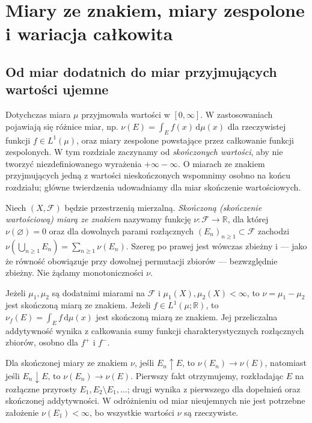 \chapter[Miary ze znakiem i zespolone]{Miary ze znakiem, miary zespolone i wariacja całkowita}
\label{ch:miary-ze-znakiem}

\section{Od miar dodatnich do miar przyjmujących wartości ujemne}
Dotychczas miara $\mu$ przyjmowała wartości w $[0,\infty]$.
W zastosowaniach pojawiają się różnice miar, np.
$\nu(E)=\int_E f(x)\,\mathrm d\mu(x)$ dla rzeczywistej
funkcji $f\in L^1(\mu)$, oraz miary zespolone
powstające przez całkowanie funkcji zespolonych.
W tym rozdziale zaczynamy od \emph{skończonych wartości},
aby nie tworzyć niezdefiniowanego wyrażenia $+\infty-\infty$.
O miarach ze znakiem przyjmujących jedną z wartości
nieskończonych wspomnimy osobno na końcu rozdziału;
główne twierdzenia udowadniamy dla miar skończenie wartościowych.

\begin{definicja}
\label{def:signed-measure-16}
Niech $(X,\mathcal F)$ będzie przestrzenią mierzalną.
\emph{Skończoną (skończenie wartościową) miarą ze znakiem}
nazywamy funkcję $\nu:\mathcal F\to\mathbb R$, dla której
$\nu(\varnothing)=0$ oraz dla dowolnych parami rozłącznych
$(E_n)_{n\ge1}\subset\mathcal F$ zachodzi
$\nu(\bigcup_{n\ge1}E_n)=\sum_{n\ge1}\nu(E_n)$.
Szereg po prawej jest wówczas zbieżny i — jako że równość
obowiązuje przy dowolnej permutacji zbiorów — bezwzględnie
zbieżny. Nie żądamy monotoniczności $\nu$.
\end{definicja}

\begin{przyklad}
Jeżeli $\mu_1,\mu_2$ są dodatnimi miarami na $\mathcal F$
i $\mu_1(X),\mu_2(X)<\infty$, to $\nu=\mu_1-\mu_2$
jest skończoną miarą ze znakiem.
Jeżeli $f\in L^1(\mu;\mathbb R)$, to
$\nu_f(E)=\int_E f\,\mathrm d\mu(x)$ jest skończoną miarą ze znakiem.
Jej przeliczalna addytywność wynika z całkowania sumy
funkcji charakterystycznych rozłącznych zbiorów, osobno dla $f^+$ i $f^-$.
\end{przyklad}

\begin{uwaga}
Dla skończonej miary ze znakiem $\nu$, jeśli
$E_n\uparrow E$, to $\nu(E_n)\to\nu(E)$, natomiast
jeśli $E_n\downarrow E$, to $\nu(E_n)\to\nu(E)$.
Pierwszy fakt otrzymujemy, rozkładając $E$ na rozłączne
przyrosty $E_1,E_2\setminus E_1,\dots$; drugi wynika
z pierwszego dla dopełnień oraz skończonej addytywności.
W odróżnieniu od miar nieujemnych nie jest potrzebne
założenie $\nu(E_1)<\infty$, bo wszystkie wartości
$\nu$ są rzeczywiste.
\end{uwaga}

